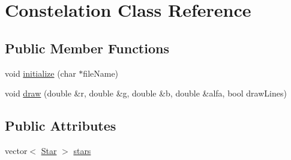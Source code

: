 \hypertarget{class_constelation}{\section{Constelation Class Reference}
\label{class_constelation}
}
\subsection*{Public Member Functions}
\begin{DoxyCompactItemize}
\item 
void \hyperlink{class_constelation_a67e8f8db581831ce96b9002250547784}{initialize} (char $\ast$file\+Name)
\item 
void \hyperlink{class_constelation_ae35262da5bcbf0123eb568f512aa45e8}{draw} (double \&r, double \&g, double \&b, double \&alfa, bool draw\+Lines)
\end{DoxyCompactItemize}
\subsection*{Public Attributes}
\begin{DoxyCompactItemize}
\item 
vector$<$ \hyperlink{class_star}{Star} $>$ \hyperlink{class_constelation_a71d208ee2a6b57c32f28044ee7acad55}{stars}
\end{DoxyCompactItemize}


